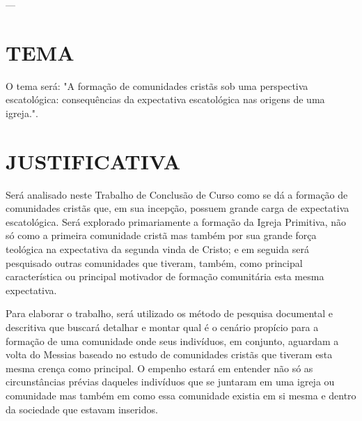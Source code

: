 \documentclass[
    article,            %
	12pt,				%
	oneside,			%
	a4paper,			%
	english,			%
	french,				%
	spanish,			%
	brazil				%
	]{abntex2}
\begin{document}



\imprimircapa

\imprimirfolhaderosto

---
\tableofcontents*
\cleardoublepage

\textual

\section{TEMA}
O tema será: "A formação de comunidades cristãs sob uma perspectiva escatológica: consequências da expectativa escatológica nas origens de uma igreja.".

\section{JUSTIFICATIVA}
Será analisado neste Trabalho de Conclusão de Curso como se dá a formação de comunidades cristãs que, em sua incepção, possuem grande carga de expectativa escatológica. Será explorado primariamente a formação da Igreja Primitiva, não só como a primeira comunidade cristã mas também por sua grande força teológica na expectativa da segunda vinda de Cristo; e em seguida será pesquisado outras comunidades que tiveram, também, como principal característica ou principal motivador de formação comunitária esta mesma expectativa.

Para elaborar o trabalho, será utilizado os método de pesquisa documental e descritiva que buscará detalhar e montar qual é o cenário propício para a formação de uma comunidade onde seus indivíduos, em conjunto, aguardam a volta do Messias baseado no estudo de comunidades cristãs que tiveram esta mesma crença como principal. O empenho estará em entender não só as circunstâncias prévias daqueles indivíduos que se juntaram em uma igreja ou comunidade mas também em como essa comunidade existia em si mesma e dentro da sociedade que estavam inseridos.
\end{document}
